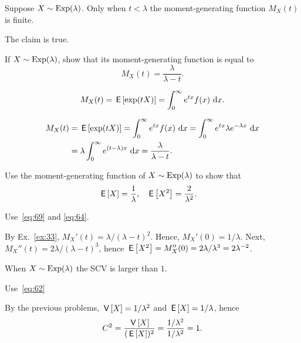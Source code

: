 \begin{extra}[\faBalanceScale]\label{ex:11}
  Suppose $X\sim\operatorname{Exp}(\lambda)$.
  Only when $t < \lambda$ the moment-generating function $M_X(t)$ is finite.
\begin{solution} The claim is true. 
\end{solution}
\end{extra}

\begin{extra}\label{ex:33}
 If $X\sim\operatorname{Exp}(\lambda)$, show that its moment-generating function is equal to
    \begin{equation*}
    M_X(t) = \frac{\lambda}{\lambda-t}.
    \end{equation*}
   \begin{hint}
    \begin{equation*}
      M_X(t) = \,\mathsf{E}\left[\exp(t X)\right] =\int_0^\infty e^{t x} f(x) \,\,\text{d}x.
\end{equation*}
\end{hint}
    \begin{solution}
    \begin{align*}
      M_X(t) &= \,\mathsf{E}\left[\exp(t X)\right]  
=\int_0^\infty e^{tx} f(x) \,\,\text{d}x 
=\int_0^\infty e^{tx} \lambda e^{-\lambda x} \,\,\text{d}x  \\
&=\lambda \int_0^\infty e^{(t-\lambda)x} \,\,\text{d}x 
=\frac{\lambda}{\lambda -t}.
    \end{align*}
    \end{solution}
  \end{extra}

\begin{exercise}\label{ex:21}
Use the moment-generating function  of $X\sim\operatorname{Exp}(\lambda)$  to show that
    \begin{align*}
      \,\mathsf{E}\left[X\right] &=\frac1\lambda, & 
      \,\mathsf{E}\left[X^2\right] &=\frac2{\lambda^2}.
    \end{align*}
\begin{hint}
Use~\cref{eq:69} and \cref{eq:64}.
\end{hint}
\begin{solution} By Ex.~\ref{ex:33}, 
  $ M_X'(t)=\lambda/(\lambda-t)^2$. Hence, $M_X'(0)=1/\lambda$. Next, $M_X''(t)=2\lambda/(\lambda-t)^3$, hence $\,\mathsf{E}\left[X^2\right]=M_X''(0)=2\lambda/\lambda^3=2\lambda^{-2}$. 
\end{solution}
  \end{exercise}

\begin{extra}[\faBalanceScale]\label{ex:29}
When  $X\sim\operatorname{Exp}(\lambda)$ the SCV is larger than $1$.
  \begin{hint}
  Use~\cref{eq:62} 
  \end{hint}
  \begin{solution}
  By the previous problems, $\,\mathsf{V}\left[X\right] = 1/\lambda^2$ and $\,\mathsf{E}\left[X\right]=1/\lambda$, hence
  \begin{equation*}
    C^2= \frac{\,\mathsf{V}\left[X\right]}{(\,\mathsf{E}\left[X\right])^2} = \frac{1/\lambda^2}{1/\lambda^2} = 1.
  \end{equation*}
\end{solution}
\end{extra}

